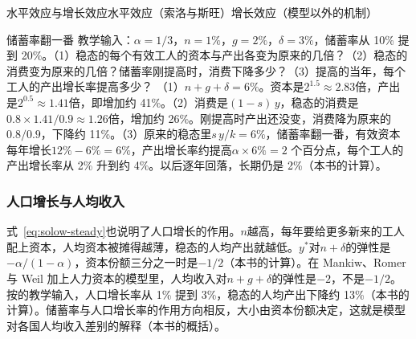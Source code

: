 \begin{compare}{水平效应与增长效应}{水平效应（索洛与斯旺）}{增长效应（模型以外的机制）}
\end{compare}

\begin{example}{储蓄率翻一番}\label{ex:solow-double}
教学输入：$\alpha=1/3$，$n=1\%$，$g=2\%$，$\delta=3\%$，储蓄率从 10\% 提到 20\%。（1）稳态的每个有效工人的资本与产出各变为原来的几倍？（2）稳态的消费变为原来的几倍？储蓄率刚提高时，消费下降多少？（3）提高的当年，每个工人的产出增长率提高多少？
\solution
（1）$n+g+\delta=6\%$。资本是$2^{1.5}\approx2.83$倍，产出是$2^{0.5}\approx1.41$倍，即增加约 41\%。（2）消费是$(1-s)\,y$，稳态的消费是$0.8\times1.41/0.9\approx1.26$倍，增加约 26\%。刚提高时产出还没变，消费降为原来的$0.8/0.9$，下降约 11\%。（3）原来的稳态里$s\,y/k=6\%$，储蓄率翻一番，有效资本每年增长$12\%-6\%=6\%$，产出增长率约提高$\alpha\times6\%=2$ 个百分点，每个工人的产出增长率从 2\% 升到约 4\%。以后逐年回落，长期仍是 2\%（本书的计算）。
\end{example}


\subsubsection{人口增长与人均收入}

式~\eqref{eq:solow-steady}也说明了人口增长的作用。$n$越高，每年要给更多新来的工人配上资本，人均资本被摊得越薄，稳态的人均产出就越低。$y^{*}$对$n+\delta$的弹性是$-\alpha/(1-\alpha)$，资本份额三分之一时是$-1/2$（本书的计算）。在 Mankiw、Romer 与 Weil 加上人力资本的模型里，人均收入对$n+g+\delta$的弹性是$-2$，不是$-1/2$\cite{mrw1990}。按的教学输入，人口增长率从 1\% 提到 3\%，稳态的人均产出下降约 13\%（本书的计算）。储蓄率与人口增长率的作用方向相反，大小由资本份额决定，这就是模型对各国人均收入差别的解释（本书的概括）。


